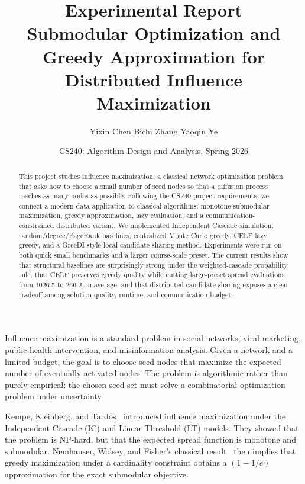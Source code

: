 \documentclass[9pt]{extarticle}
\title{\vspace{-2.2em}\textbf{Experimental Report}\\[0.35em]
\large\textbf{Submodular Optimization and Greedy Approximation for}\\[-0.05em]
\large\textbf{Distributed Influence Maximization}\vspace{-0.9em}}
\author{Yixin Chen \qquad Bichi Zhang \qquad Yaoqin Ye}
\date{CS240: Algorithm Design and Analysis, Spring 2026\vspace{-1.35em}}
\makeatletter
\renewcommand\section{\@startsection{section}{1}{\z@}{0.28em}{0.08em}{\normalfont\large\bfseries}}
\makeatother
\begin{document}
\maketitle
\vspace{-0.75em}

\begin{abstract}
This project studies influence maximization, a classical network optimization
problem that asks how to choose a small number of seed nodes so that a diffusion
process reaches as many nodes as possible. Following the CS240 project
requirements, we connect a modern data application to classical algorithms:
monotone submodular maximization, greedy approximation, lazy evaluation, and a
communication-constrained distributed variant. We implemented Independent
Cascade simulation, random/degree/PageRank baselines, centralized Monte Carlo
greedy, CELF lazy greedy, and a GreeDI-style local candidate sharing method.
Experiments were run on both quick small benchmarks and a larger course-scale
preset. The current results show that structural baselines are surprisingly
strong under the weighted-cascade probability rule, that CELF preserves greedy
quality while cutting large-preset spread evaluations from 1026.5 to 266.2 on
average, and that distributed candidate sharing exposes a clear tradeoff among
solution quality, runtime, and communication budget.
\end{abstract}

\section{Background and Related Work}

Influence maximization is a standard problem in social networks, viral
marketing, public-health intervention, and misinformation analysis. Given a
network and a limited budget, the goal is to choose seed nodes that maximize
the expected number of eventually activated nodes. The problem is algorithmic
rather than purely empirical: the chosen seed set must solve a combinatorial
optimization problem under uncertainty.

Kempe, Kleinberg, and Tardos~\cite{kempe2003} introduced influence
maximization under the Independent Cascade (IC) and Linear Threshold (LT)
models. They showed that the problem is NP-hard, but that the expected spread
function is monotone and submodular. Nemhauser, Wolsey, and Fisher's classical
result~\cite{nemhauser1978} then implies that greedy maximization under a
cardinality constraint obtains a $(1-1/e)$ approximation for the exact
submodular objective.
\end{document}
